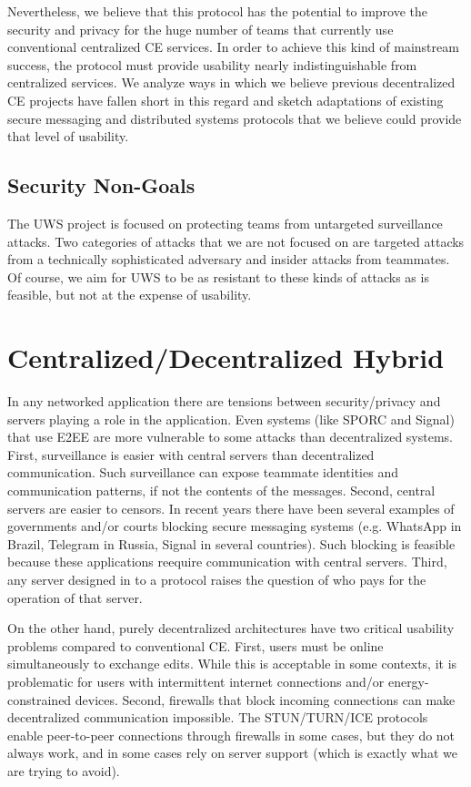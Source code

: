 \documentclass{article}
\begin{document}
Nevertheless, we believe that this protocol has the potential to improve the security and privacy for the huge number of teams that currently use conventional centralized CE services.
In order to achieve this kind of mainstream success, the protocol must provide usability nearly indistinguishable from centralized services.
We analyze ways in which we believe previous decentralized CE projects have fallen short in this regard and sketch adaptations of existing secure messaging and distributed systems protocols that we believe could provide that level of usability.

\subsection{Security Non-Goals}

The UWS project is focused on protecting teams from untargeted surveillance attacks.
Two categories of attacks that we are not focused on are targeted attacks from a technically sophisticated adversary and insider attacks from teammates.
Of course, we aim for UWS to be as resistant to these kinds of attacks as is feasible, but not at the expense of usability.

\section{Centralized/Decentralized Hybrid}

In any networked application there are tensions between security{\slash}privacy and servers playing a role in the application.
Even systems (like SPORC and Signal) that use E2EE are more vulnerable to some attacks than decentralized systems.
First, surveillance is easier with central servers than decentralized communication.
Such surveillance can expose teammate identities and communication patterns, if not the contents of the messages.
Second, central servers are easier to censors.
In recent years there have been several examples of governments and{\slash}or courts blocking secure messaging systems (e.g. WhatsApp in Brazil, Telegram in Russia, Signal in several countries).
Such blocking is feasible because these applications reequire communication with central servers.
Third, any server designed in to a protocol raises the question of who pays for the operation of that server.

On the other hand, purely decentralized architectures have two critical usability problems compared to conventional CE.
First, users must be online simultaneously to exchange edits\footnotemark{}.
While this is acceptable in some contexts, it is problematic for users with intermittent internet connections and/or energy-constrained devices.
Second, firewalls that block incoming connections can make decentralized communication impossible.
The STUN{\slash}TURN{\slash}ICE protocols enable peer-to-peer connections through firewalls in some cases, but they do not always work, and in some cases rely on server support (which is exactly what we are trying to avoid).
\end{document}
